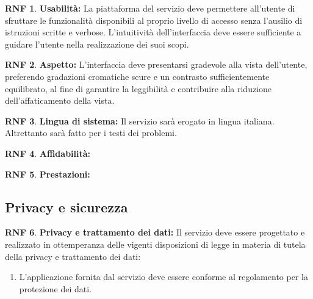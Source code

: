 \documentclass[11pt, a4paper]{article}
\theoremstyle{definition}
\newtheorem{nonfuncreq}{RNF} %
\begin{document}
\begin{nonfuncreq}
\textbf{Usabilità:}
La piattaforma del servizio deve permettere all'utente di sfruttare le
funzionalità disponibili al proprio livello di accesso senza l'ausilio di
istruzioni scritte e verbose. L'intuitività dell'interfaccia deve essere
sufficiente a guidare l'utente nella realizzazione dei suoi scopi.
\end{nonfuncreq}

\begin{nonfuncreq}
\textbf{Aspetto:}
L'interfaccia deve presentarsi gradevole alla vista dell'utente, preferendo
gradazioni cromatiche scure e un contrasto sufficientemente equilibrato,
al fine di garantire la leggibilità e contribuire alla riduzione
dell'affaticamento della vista.
\end{nonfuncreq}

\begin{nonfuncreq}
\textbf{Lingua di sistema:}
Il servizio sarà erogato in lingua italiana. Altrettanto sarà fatto per i
testi dei problemi.
\end{nonfuncreq}

\begin{nonfuncreq}
\textbf{Affidabilità:}

\end{nonfuncreq}

\begin{nonfuncreq}
\textbf{Prestazioni:}
\end{nonfuncreq}

\subsection{Privacy e sicurezza}

\begin{nonfuncreq}
\textbf{Privacy e trattamento dei dati:}
Il servizio deve essere progettato e realizzato in ottemperanza delle
vigenti disposizioni di legge in materia di tutela della privacy e
trattamento dei dati:
\begin{enumerate}
    \item L'applicazione fornita dal servizio deve essere conforme
    al regolamento \href{https://www.garanteprivacy.it/documents/10160/0/Regolamento+UE+2016+679.+Arricchito+con+riferimenti+ai+Considerando+Aggiornato+alle+rettifiche+pubblicate+sulla+Gazzetta+Ufficiale++dell%27Unione+europea+127+del+23+maggio+2018}{\textcolor{blue}{\underbar{UE n.2016/679}}} per la protezione dei dati.
\end{enumerate}
\end{nonfuncreq}
\end{document}
